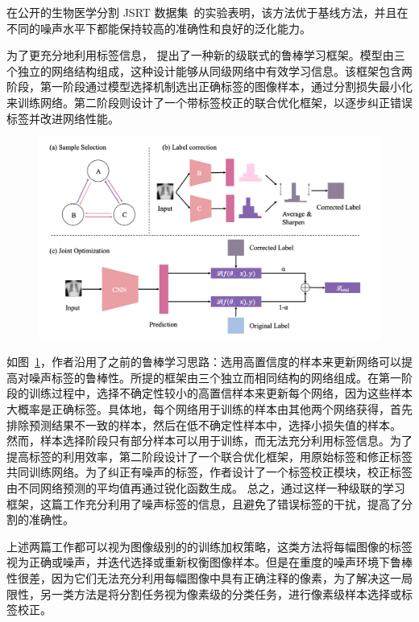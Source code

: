 在公开的生物医学分割 JSRT 数据集~\cite{Shiraishi2000DevelopmentOA}的实验表明，该方法优于基线方法，并且在不同的噪声水平下都能保持较高的准确性和良好的泛化能力。


为了更充分地利用标签信息，\citet{Xue2020CascadedRL} 提出了一种新的级联式的鲁棒学习框架。模型由三个独立的网络结构组成，这种设计能够从同级网络中有效学习信息。该框架包含两阶段，第一阶段通过模型选择机制选出正确标签的图像样本，通过分割损失最小化来训练网络。第二阶段则设计了一个带标签校正的联合优化框架，以逐步纠正错误标签并改进网络性能。
    \begin{figure}[tbp]
        \centering 
        \includegraphics[width=1.0\textwidth]{img/c2/rel_c2.png}
        \label{c2_fig12}
    \end{figure}
如图~\ref{c2_fig12}，作者沿用了之前的鲁棒学习思路：选用高置信度的样本来更新网络可以提高对噪声标签的鲁棒性。所提的框架由三个独立而相同结构的网络组成。在第一阶段的训练过程中，选择不确定性较小的高置信样本来更新每个网络，因为这些样本大概率是正确标签。具体地，每个网络用于训练的样本由其他两个网络获得，首先排除预测结果不一致的样本，然后在低不确定性样本中，选择小损失值的样本。
然而，样本选择阶段只有部分样本可以用于训练，而无法充分利用标签信息。为了提高标签的利用效率，第二阶段设计了一个联合优化框架，用原始标签和修正标签共同训练网络。为了纠正有噪声的标签，作者设计了一个标签校正模块，校正标签由不同网络预测的平均值再通过锐化函数生成。
总之，通过这样一种级联的学习框架，这篇工作充分利用了噪声标签的信息，且避免了错误标签的干扰，提高了分割的准确性。


上述两篇工作都可以视为图像级别的的训练加权策略，这类方法将每幅图像的标签视为正确或噪声，并迭代选择或重新权衡图像样本。但是在重度的噪声环境下鲁棒性很差，因为它们无法充分利用每幅图像中具有正确注释的像素，为了解决这一局限性，另一类方法是将分割任务视为像素级的分类任务，进行像素级样本选择或标签校正。


